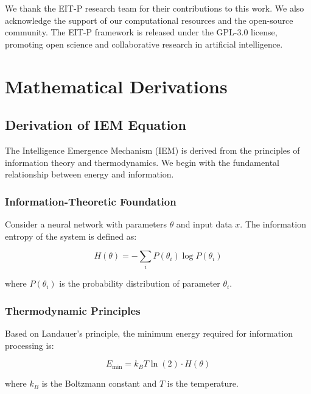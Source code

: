 \documentclass[12pt]{article}
\begin{document}
We thank the EIT-P research team for their contributions to this work. We also acknowledge the support of our computational resources and the open-source community. The EIT-P framework is released under the GPL-3.0 license, promoting open science and collaborative research in artificial intelligence.




\appendix

\section{Mathematical Derivations}

\subsection{Derivation of IEM Equation}

The Intelligence Emergence Mechanism (IEM) is derived from the principles of information theory and thermodynamics. We begin with the fundamental relationship between energy and information.

\subsubsection{Information-Theoretic Foundation}

Consider a neural network with parameters $\theta$ and input data $x$. The information entropy of the system is defined as:

\begin{equation}
H(\theta) = -\sum_{i} P(\theta_i) \log P(\theta_i)
\end{equation}

where $P(\theta_i)$ is the probability distribution of parameter $\theta_i$.

\subsubsection{Thermodynamic Principles}

Based on Landauer's principle, the minimum energy required for information processing is:

\begin{equation}
E_{\min} = k_B T \ln(2) \cdot H(\theta)
\end{equation}

where $k_B$ is the Boltzmann constant and $T$ is the temperature.
\end{document}
